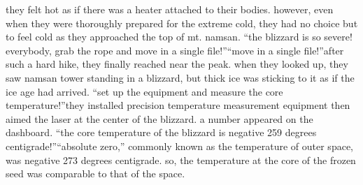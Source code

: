  they felt hot as if there was a heater attached to their bodies.
however, even when they were thoroughly prepared for the extreme cold, they had no choice but to feel cold as they approached the top of mt.
 namsan.
“the blizzard is so severe! everybody, grab the rope and move in a single file!”“move in a single file!”after such a hard hike, they finally reached near the peak.
 when they looked up, they saw namsan tower standing in a blizzard, but thick ice was sticking to it as if the ice age had arrived.
“set up the equipment and measure the core temperature!”they installed precision temperature measurement equipment then aimed the laser at the center of the blizzard.
 a number appeared on the dashboard.
“the core temperature of the blizzard is negative 259 degrees centigrade!”“absolute zero,” commonly known as the temperature of outer space, was negative 273 degrees centigrade.
 so, the temperature at the core of the frozen seed was comparable to that of the space.

